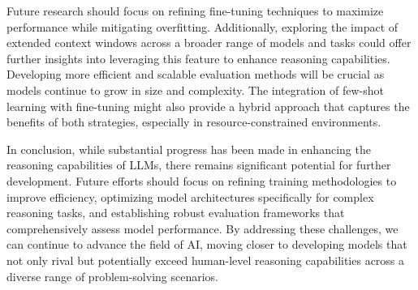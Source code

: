 Future research should focus on refining fine-tuning techniques to maximize performance while mitigating overfitting. Additionally, exploring the impact of extended context windows across a broader range of models and tasks could offer further insights into leveraging this feature to enhance reasoning capabilities. Developing more efficient and scalable evaluation methods will be crucial as models continue to grow in size and complexity. The integration of few-shot learning with fine-tuning might also provide a hybrid approach that captures the benefits of both strategies, especially in resource-constrained environments.

In conclusion, while substantial progress has been made in enhancing the reasoning capabilities of LLMs, there remains significant potential for further development. Future efforts should focus on refining training methodologies to improve efficiency, optimizing model architectures specifically for complex reasoning tasks, and establishing robust evaluation frameworks that comprehensively assess model performance. By addressing these challenges, we can continue to advance the field of AI, moving closer to developing models that not only rival but potentially exceed human-level reasoning capabilities across a diverse range of problem-solving scenarios.

